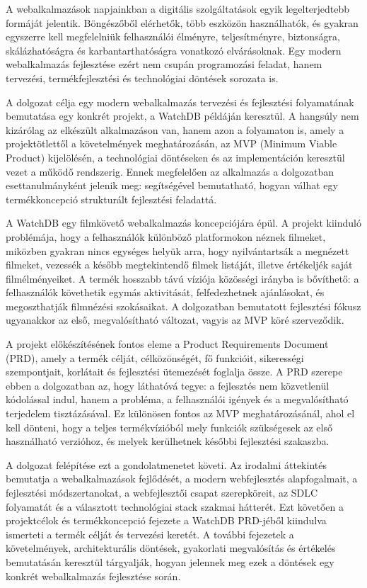 \label{chap:introduction}

A webalkalmazások napjainkban a digitális szolgáltatások egyik legelterjedtebb formáját jelentik. Böngészőből elérhetők, több eszközön használhatók, és gyakran egyszerre kell megfelelniük felhasználói élményre, teljesítményre, biztonságra, skálázhatóságra és karbantarthatóságra vonatkozó elvárásoknak. Egy modern webalkalmazás fejlesztése ezért nem csupán programozási feladat, hanem tervezési, termékfejlesztési és technológiai döntések sorozata is.

A dolgozat célja egy modern webalkalmazás tervezési és fejlesztési folyamatának bemutatása egy konkrét projekt, a WatchDB példáján keresztül. A hangsúly nem kizárólag az elkészült alkalmazáson van, hanem azon a folyamaton is, amely a projektötlettől a követelmények meghatározásán, az MVP (Minimum Viable Product) kijelölésén, a technológiai döntéseken és az implementáción keresztül vezet a működő rendszerig. Ennek megfelelően az alkalmazás a dolgozatban esettanulmányként jelenik meg: segítségével bemutatható, hogyan válhat egy termékkoncepció strukturált fejlesztési feladattá.

A WatchDB egy filmkövető webalkalmazás koncepciójára épül. A projekt kiinduló problémája, hogy a felhasználók különböző platformokon néznek filmeket, miközben gyakran nincs egységes helyük arra, hogy nyilvántartsák a megnézett filmeket, vezessék a később megtekintendő filmek listáját, illetve értékeljék saját filmélményeiket. A termék hosszabb távú víziója közösségi irányba is bővíthető: a felhasználók követhetik egymás aktivitását, felfedezhetnek ajánlásokat, és megoszthatják filmnézési szokásaikat. A dolgozatban bemutatott fejlesztési fókusz ugyanakkor az első, megvalósítható változat, vagyis az MVP köré szerveződik.

A projekt előkészítésének fontos eleme a Product Requirements Document (PRD), amely a termék célját, célközönségét, fő funkcióit, sikerességi szempontjait, korlátait és fejlesztési ütemezését foglalja össze. A PRD szerepe ebben a dolgozatban az, hogy láthatóvá tegye: a fejlesztés nem közvetlenül kódolással indul, hanem a probléma, a felhasználói igények és a megvalósítható terjedelem tisztázásával. Ez különösen fontos az MVP meghatározásánál, ahol el kell dönteni, hogy a teljes termékvízióból mely funkciók szükségesek az első használható verzióhoz, és melyek kerülhetnek későbbi fejlesztési szakaszba.

A dolgozat felépítése ezt a gondolatmenetet követi. Az irodalmi áttekintés bemutatja a webalkalmazások fejlődését, a modern webfejlesztés alapfogalmait, a fejlesztési módszertanokat, a webfejlesztői csapat szerepköreit, az SDLC folyamatát és a választott technológiai stack szakmai hátterét. Ezt követően a projektcélok és termékkoncepció fejezete a WatchDB PRD-jéből kiindulva ismerteti a termék célját és tervezési keretét. A további fejezetek a követelmények, architekturális döntések, gyakorlati megvalósítás és értékelés bemutatásán keresztül tárgyalják, hogyan jelennek meg ezek a döntések egy konkrét webalkalmazás fejlesztése során.
